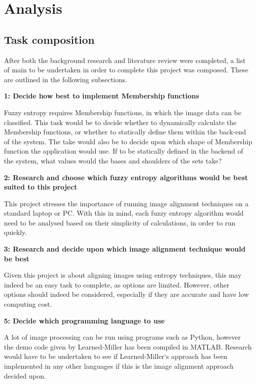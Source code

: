 \section{Analysis}

\subsection{Task composition}

After both the background research and literature review were completed, a list of main  to be undertaken in order to complete this project was composed. These are outlined in the following subsections.

\noindent \textbf{1: Decide how best to implement Membership functions}

Fuzzy entropy requires Membership functions, in which the image data can be classified. This task would be to decide whether to dynamically calculate the Membership functions, or whether to statically define them within the back-end of the system. The take would also be to decide upon which shape of Membership function the application would use. If to be statically defined in the backend of the system, what values would the bases and shoulders of the sets take?

\noindent \textbf{2: Research and choose which fuzzy entropy algorithms would be best suited to this project}

This project stresses the importance of running image alignment techniques on a standard laptop or PC. With this in mind, each fuzzy entropy algorithm would need to be analysed based on their simplicity of calculations, in order to run quickly.

\noindent \textbf{3: Research and decide upon which image alignment technique would be best}

Given this project is about aligning images using entropy techniques, this may indeed be an easy task to complete, as options are limited. However, other options should indeed be considered, especially if they are accurate and have low computing cost.

\noindent \textbf{5: Decide which programming language to use}

A lot of image processing can be run using programs such as Python, however the demo code given by Learned-Miller \cite{joint-alignment} has been compiled in MATLAB. Research would have to be undertaken to see if Learned-Miller`s approach has been implemented in any other languages if this is the image alignment approach decided upon.

